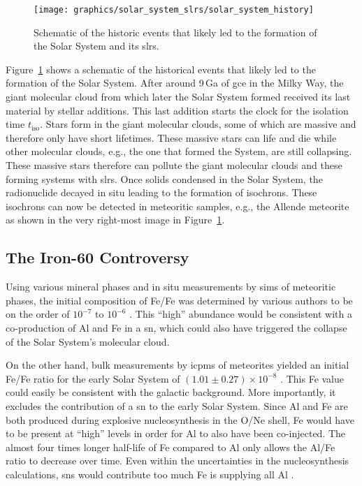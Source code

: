 \begin{figure}[tb]
    \centering
    \texttt{[image: graphics/solar\_system\_slrs/solar\_system\_history]}
    \caption{Schematic of the historic events that likely led to the formation of the Solar System and its \acp{slr}.}
    \label{fig:solar_system_slrs:solar_system_history}
\end{figure}
Figure~\ref{fig:solar_system_slrs:solar_system_history} shows a schematic of the historical events that likely led to the formation of the Solar System. After around 9\,Ga of \ac{gce} in the Milky Way, the giant molecular cloud from which later the Solar System formed received its last material by stellar additions. This last addition starts the clock for the isolation time $t_\mathrm{iso}$. Stars form in the giant molecular clouds, some of which are massive and therefore only have short lifetimes. These massive stars can life and die while other molecular clouds, e.g., the one that formed the System, are still collapsing. These massive stars therefore can pollute the giant molecular clouds and these forming systems with \acp{slr}. Once solids condensed in the Solar System, the radionuclide decayed in situ leading to the formation of isochrons. These isochrons can now be detected in meteoritic samples, e.g., the Allende meteorite as shown in the very right-most image in Figure~\ref{fig:solar_system_slrs:solar_system_history}.


\subsection{The Iron-60 Controversy} \label{sec:solar_system_slrs:fe60_controversy}

Using various mineral phases and in situ measurements by \acf{sims} of meteoritic phases, the initial composition of Fe/Fe was determined by various authors to be on the order of $10^{-7}$ to $10^{-6}$ \citep[e.g.,][]{mishra14,telus18}. This ``high'' abundance would be consistent with a co-production of Al and Fe in a \ac{sn}, which could also have triggered the collapse of the Solar System's molecular cloud.

On the other hand, bulk measurements by \acf{icpms} of meteorites yielded an initial Fe/Fe ratio for the early Solar System of $(1.01 \pm 0.27)\times10^{-8}$ \citep{tang12,tang15}. This Fe value could easily be consistent with the galactic background. More importantly, it excludes the contribution of a \ac{sn} to the early Solar System. Since Al and Fe are both produced during explosive nucleosynthesis in the O/Ne shell, Fe would have to be present at ``high'' levels in order for Al to also have been co-injected. The almost four times longer half-life of Fe compared to Al only allows the Al/Fe ratio to decrease over time. Even within the uncertainties in the nucleosynthesis calculations, \acp{sn} would contribute too much Fe is supplying all Al \citep{jones19}. 

